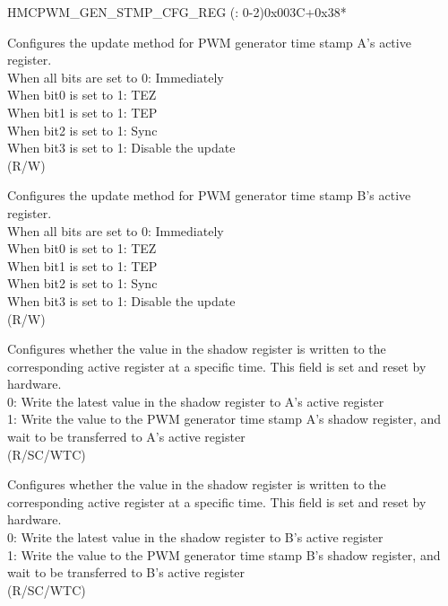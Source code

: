 \begin{register}{H}{MCPWM\_GEN\_STMP\_CFG\_REG (: 0-2)}{0x003C+0x38*}\label{regdesc:MCPWMGENNSTMPCFGREG}
%
%
%
%
%
\regnewline%
\begin{regdesc}\begin{reglist}
\label{fielddesc:MCPWMCMPRNAUPMETHOD}\item [MCPWM\_CMPR\regindex{n}\_A\_UPMETHOD] Configures the update method for PWM generator time stamp A's active register. 
\\When all bits are set to 0: Immediately
\\When bit0 is set to 1: TEZ 
\\When bit1 is set to 1: TEP 
\\When bit2 is set to 1: Sync
\\When bit3 is set to 1: Disable the update 
\\(R/W)
\label{fielddesc:MCPWMCMPRNBUPMETHOD}\item [MCPWM\_CMPR\regindex{n}\_B\_UPMETHOD] Configures the update method for PWM generator time stamp B's active register. 
\\When all bits are set to 0: Immediately
\\When bit0 is set to 1: TEZ 
\\When bit1 is set to 1: TEP 
\\When bit2 is set to 1: Sync
\\When bit3 is set to 1: Disable the update 
\\(R/W)
\label{fielddesc:MCPWMCMPRNASHDWFULL}\item [MCPWM\_CMPR\regindex{n}\_A\_SHDW\_FULL] Configures whether the value in the shadow register is written to the corresponding active register at a specific time. This field is set and reset by hardware. \\
0: Write the latest value in the shadow register to A's active register \\
1: Write the value to the PWM generator time stamp A's shadow register, and wait to be transferred to A's active register \\
(R/SC/WTC)
\label{fielddesc:MCPWMCMPRNBSHDWFULL}\item [MCPWM\_CMPR\regindex{n}\_B\_SHDW\_FULL] Configures whether the value in the shadow register is written to the corresponding active register at a specific time. This field is set and reset by hardware. \\
0: Write the latest value in the shadow register to B's active register \\
1: Write the value to the PWM generator time stamp B's shadow register, and wait to be transferred to B's active register \\
(R/SC/WTC)
\end{reglist}\end{regdesc}
\end{register}


